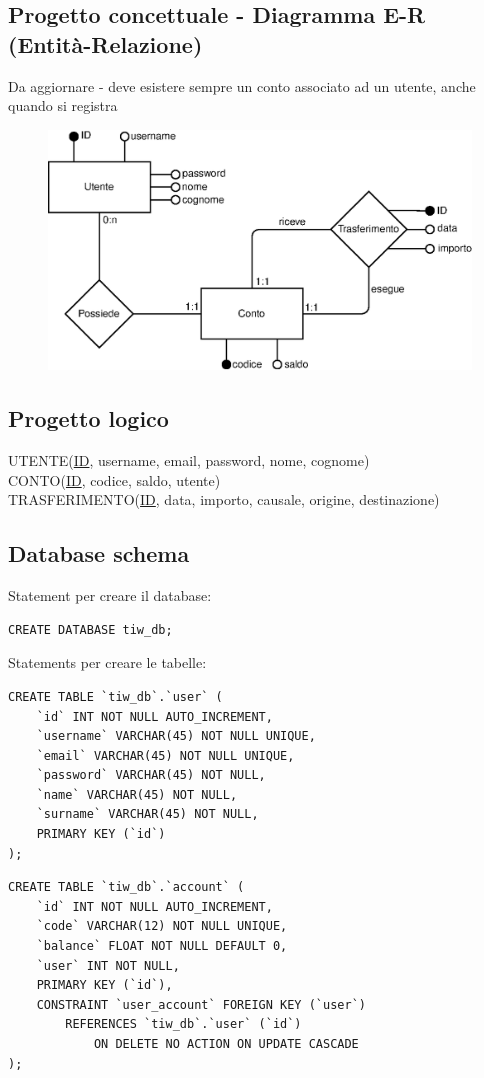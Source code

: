 \documentclass{article}
\begin{document}
\subsection{Progetto concettuale - Diagramma E-R (Entità-Relazione)}
Da aggiornare - deve esistere sempre un conto associato ad un utente, anche quando si registra
\begin{figure}[H]
\centering
\includegraphics[width=1\textwidth]{assets/diagram.eps}
\end{figure}

\subsection{Progetto logico}
UTENTE(\underline{ID}, username, email, password, nome, cognome)
\\
CONTO(\underline{ID}, codice, saldo, utente)
\\
TRASFERIMENTO(\underline{ID}, data, importo, causale, origine, destinazione)

\subsection{Database schema}
Statement per creare il database:
\begin{verbatim}
CREATE DATABASE tiw_db;
\end{verbatim}

Statements per creare le tabelle:
\begin{verbatim}
CREATE TABLE `tiw_db`.`user` (
	`id` INT NOT NULL AUTO_INCREMENT,
	`username` VARCHAR(45) NOT NULL UNIQUE,
	`email` VARCHAR(45) NOT NULL UNIQUE,
	`password` VARCHAR(45) NOT NULL,
	`name` VARCHAR(45) NOT NULL,
	`surname` VARCHAR(45) NOT NULL,
	PRIMARY KEY (`id`)
);

\end{verbatim}
\pagebreak
\begin{verbatim}
CREATE TABLE `tiw_db`.`account` (
	`id` INT NOT NULL AUTO_INCREMENT,
	`code` VARCHAR(12) NOT NULL UNIQUE,
	`balance` FLOAT NOT NULL DEFAULT 0,
	`user` INT NOT NULL,
	PRIMARY KEY (`id`),
	CONSTRAINT `user_account` FOREIGN KEY (`user`) 
		REFERENCES `tiw_db`.`user` (`id`) 
			ON DELETE NO ACTION ON UPDATE CASCADE
);
\end{verbatim}
\end{document}
